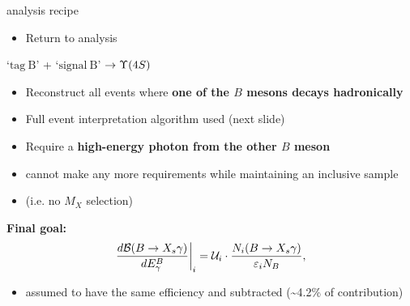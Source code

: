\documentclass[xcolor=dvipsnames]{beamer}
\begin{document}
   \begin{frame}{\BtoXsgamma analysis recipe}
      \scriptsize\centering
      \begin{itemize}
         \item Return to \BtoXsgamma analysis
      \end{itemize}
      
      `$\mathrm{tag~B}$' + `$\mathrm{signal~B}$' $\ra \FourS$
     
      \begin{itemize}
         \item Reconstruct all events where \textbf{one of the $B$ mesons decays hadronically}
         \item[\to] Full event interpretation algorithm used (next slide)
         \item Require a \textbf{high-energy photon from the other $B$ meson}
         \item[\to] cannot make any more requirements while maintaining an inclusive sample 
         \item[] (i.e. no $M_X$ selection)
      \end{itemize}
\textbf{Final goal:}
      \begin{equation}\nonumber
         \left.\frac{d\mathcal{B}(\BtoXsgamma)}{d\EB}\right|_i = \mathcal{U}_i \cdot \frac{N_i(\BtoXsgamma)}{\varepsilon_i N_{B}},
      \end{equation}
      \begin{itemize}
         \item \BtoXdgamma assumed to have the same efficiency and subtracted (\sim 4.2\% of contribution)
      \end{itemize}
   \end{frame}
\end{document}
